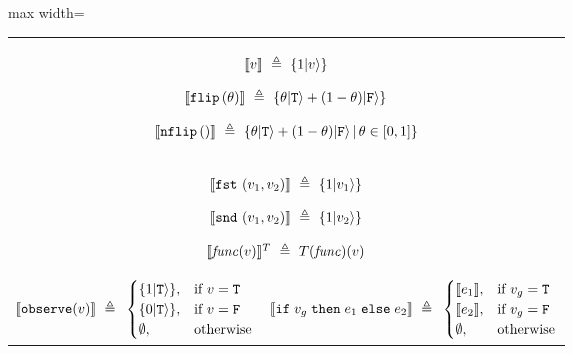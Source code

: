 \begin{figure}
		\begin{center}
		\begin{adjustbox}{max width=\textwidth}
				\renewcommand{\arraystretch}{2.1}
				\begin{tabular}{c@{\qquad}c}
					\multicolumn{2}{c}{ 
					$\llbracket v \rrbracket ~{}\triangleq{}~ \{1|v\rangle \}$ 
					\hfill
					
					$\llbracket \texttt{flip} \left(\theta\right)  \rrbracket ~{}\triangleq{}~ \{\theta|\texttt{T}\rangle + (1 - \theta)|\texttt{F}\rangle\}$
					
					\hfill
					$\llbracket \texttt{nflip}\left(\right)  \rrbracket ~{}\triangleq{}~
					\{\theta|\texttt{T}\rangle +  (1-\theta)|\texttt{F}\rangle \,|\, \theta \in [0,1]\}$

					}
					\\
					
					
					\multicolumn{2}{c}{ 
						
						$\llbracket \texttt{fst}\,\,(v_1, v_2) \rrbracket ~{}\triangleq{}~ \{1|v_1\rangle \}$
						\hfill
						
						
						$\llbracket \texttt{snd}\,\,(v_1, v_2) \rrbracket ~{}\triangleq{}~ \{1|v_2\rangle \}$
						\hfill
						
						$\llbracket \mathit{func}(v) \rrbracket^T ~{}\triangleq{}~ T(\mathit{func})(v)$
					}
					\\[1em]
					$\llbracket \textnormal{\texttt{observe}} (v) \rrbracket ~{}\triangleq{}~ \begin{cases}
						\{1|\texttt{T}\rangle\},	&\text{if } v = \texttt{T}\\
						\{0|\texttt{T}\rangle\},	&\text{if } v = \texttt{F}\\
						\emptyset, 		& \text{otherwise}\\
					\end{cases}$
					&
					
					$\llbracket \textnormal{\texttt{if}}\;{v_g}\;\texttt{then}\; e_1 \; \textnormal{\texttt{else}}\; e_2  \rrbracket ~{}\triangleq{}~ \begin{cases}
						\llbracket e_1\rrbracket, 	& \text{if } v_g = \texttt{T}\\
						\llbracket e_2\rrbracket, 	& \text{if } v_g = \texttt{F}\\
						\emptyset,				& \text{otherwise}\\
					\end{cases} $
					\\
					

\end{tabular}
\end{adjustbox}
\end{center}
\end{figure}
